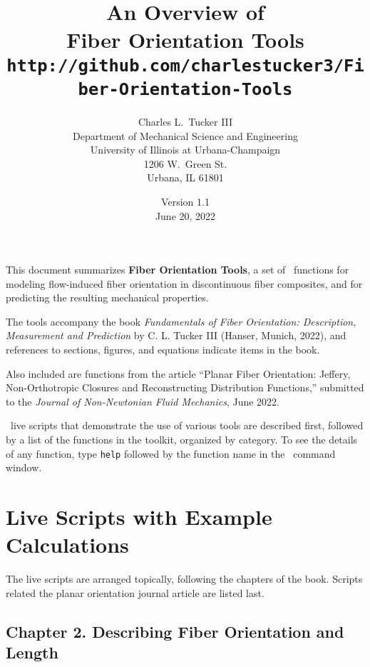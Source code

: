 \documentclass[11pt]{article}
\title{An Overview of \\
      \textbf{Fiber Orientation Tools} \\
      { \normalsize \texttt{http://github.com/charlestucker3/Fiber-Orientation-Tools}} }
\author{Charles L.~Tucker III \\
       Department of Mechanical Science and Engineering \\
        University of Illinois at Urbana-Champaign \\
        1206 W.~Green St. \\
        Urbana, IL 61801
        }
\date{Version 1.1 \\June 20, 2022}  %
\begin{document}
\maketitle

This document summarizes \textbf{Fiber Orientation Tools}, a set of \matlab\ functions for modeling flow-induced fiber orientation in discontinuous fiber composites, and for predicting the resulting mechanical properties.  

The tools accompany the book \textit{Fundamentals of Fiber Orientation: Description, Measurement and Prediction} by C. L. Tucker III (Hanser, Munich, 2022), and references to sections, figures, and equations indicate items in the book.  

Also included are functions from the article ``Planar Fiber Orientation: Jeffery, Non-Orthotropic Closures and Reconstructing Distribution Functions,'' submitted to the \textit{Journal of Non-Newtonian Fluid Mechanics}, June 2022.

 \matlab\ live scripts that demonstrate the use of various tools are described first, followed by a list of the functions in the toolkit, organized by category.  To see the details of any function, type \texttt{help} followed by the function name in the \matlab\ command window.



\section{Live Scripts with Example Calculations}

The live scripts are arranged topically, following the chapters of the book.  Scripts related the planar orientation journal article are listed last.

\subsection*{Chapter 2.  Describing Fiber Orientation and Length}
\end{document}
